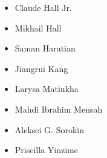 \begin{itemize}
	\item Claude Hall Jr.
	\item Mikhail Hall
	\item Saman Haratian
	\item Jiangrui Kang
	\item Larysa Matiukha
	\item Mahdi Ibrahim Mensah
	\item Aleksei G. Sorokin
	\item Priscilla Yinzime
\end{itemize}